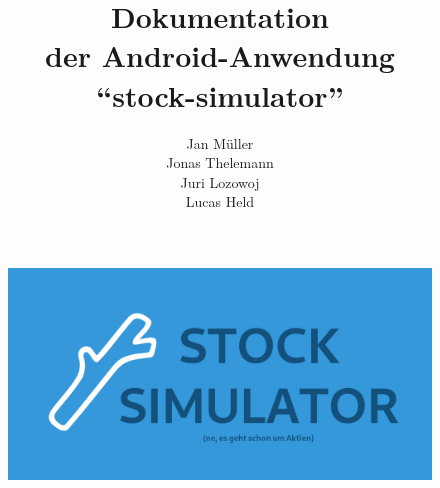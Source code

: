\documentclass[a4paper]{article}
\begin{document}
\title{\textbf{Dokumentation\\der Android-Anwendung\\"`stock-simulator"'}}
\author{
    Jan Müller\\
    Jonas Thelemann\\
    Juri Lozowoj\\
    Lucas Held
}
\maketitle

\begin{figure}[H]
    \centering
    \includegraphics[width=\textwidth,keepaspectratio]{./images/stock-simulator-social_sub.png}
\end{figure}

\pagebreak
\tableofcontents
\pagebreak
\end{document}
